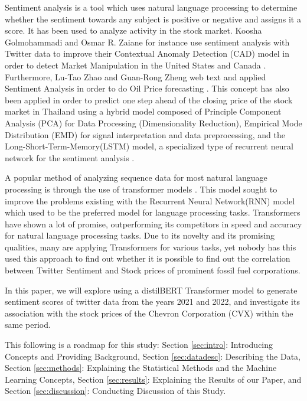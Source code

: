 \documentclass[12pt, letterpaper, titlepage]{article}
\newcommand{\jy}[1]{\textcolor{blue}{JY: #1}}
\begin{document}
Sentiment analysis \citep{medhat2014sentiment} is a tool which uses natural language processing to determine whether the sentiment towards any subject is positive or negative and assigns it a score. It has been used to analyze activity in the stock market. Koosha Golmohammadi and Osmar R. Zaiane for instance use sentiment analysis with Twitter data to improve their Contextual Anomaly Detection (CAD) model in order to detect Market Manipulation in the United States and Canada \citep{golmohammadi2017sentiment}. Furthermore, Lu-Tao Zhao and Guan-Rong Zheng web text and applied Sentiment Analysis in order to do Oil Price forecasting \citep{zhao2019forecasting}. This concept has also been applied in order to predict one step ahead of the closing price of the stock market in Thailand using a hybrid model composed of Principle Component Analysis (PCA) for Data Processing (Dimensionality Reduction), Empirical Mode Distribution (EMD) for signal interpretation and data preprocessing, and the Long-Short-Term-Memory(LSTM) model, a specialized type of recurrent neural network for the sentiment analysis \citep{srijiranon2022hybrid}.

A popular method of analyzing sequence data for most natural language processing is through the use of transformer models  \citep{vaswani2017attention}. This model sought to improve the problems existing with the Recurrent Neural Network(RNN) model which used to be the preferred model for language processing tasks. Transformers have shown a lot of promise, outperforming its competitors in speed and accuracy for natural language processing tasks. Due to its novelty and its promising qualities, many are applying Transformers for various tasks, yet nobody has this used this approach to find out whether it is possible to find out the correlation between Twitter Sentiment and Stock prices of prominent fossil fuel corporations. 

In this paper, we will explore using a distilBERT Transformer model to generate sentiment scores of twitter data from the years 2021 and 2022, and investigate its association with the stock prices of the Chevron Corporation (CVX) within the same period.


This following is a roadmap for this study: Section \ref{sec:intro}: Introducing Concepts and Providing Background, Section \ref{sec:datadesc}: Describing the Data, Section \ref{sec:methods}: Explaining the Statistical Methods and the Machine Learning Concepts, Section \ref{sec:results}: Explaining the Results of our Paper, and Section \ref{sec:discussion}: Conducting Discussion of this Study.
\end{document}
